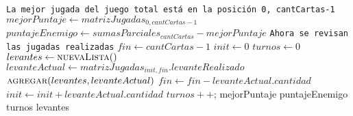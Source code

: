 \documentclass[11pt, a4paper, twoside]{article}
\begin{document}
\begin{algorithm}[H]
\footnotesize\begin{algorithmic}[1]
	\Statex \texttt{La mejor jugada del juego total está en la posición 0, cantCartas-1}
	\State $mejorPuntaje \gets matrizJugadas_{0, cantCartas -1}$			
	\State $puntajeEnemigo \gets sumasParciales_{cantCartas} - mejorPuntaje$   
	\Statex
	\Statex \texttt{Ahora se revisan las jugadas realizadas}
	\State $fin \gets cantCartas -1$										
	\State $init \gets 0$													
	\State $turnos \gets 0$													
	\State $ levantes \gets \Call{nuevaLista}$								
														
		\State $levanteActual \gets matrizJugadas_{init,fin}.levanteRealizado$	
		\State $\Call{agregar}{levantes, levanteActual}$						
							
			\State $fin \gets fin - levanteActual.cantidad $					
		\Else
			\State $init \gets init + levanteActual.cantidad $					
		\EndIf
		\State $turnos++$;														
	\EndWhile
	\State \Return mejorPuntaje													
	\State \Return puntajeEnemigo												
	\State \Return turnos														
	\State \Return levantes														
\end{algorithmic}
\end{algorithm}
\end{document}
